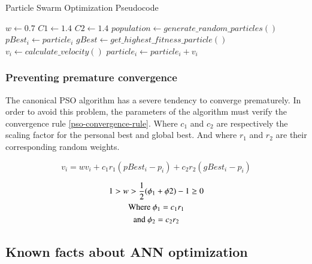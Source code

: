 \documentclass[a4paper,12pt, oneside]{memoir}
\begin{document}
\setlength{\columnsep}{20pt}
\begin{minipage}[H]{0.9\textwidth}
  \begin{algorithm}[H]\small
  \caption{Particle Swarm Optimization Pseudocode}\label{pseudocode-PSO}
    \begin{algorithmic}[1]
      \State $w  \gets 0.7$
      \State $C1 \gets 1.4$
      \State $C2 \gets 1.4$
      \State $population \gets generate\_random\_particles()$
      \Repeat
            \State $ pBest_i \gets particle_i$ 
          \EndIf
        \EndFor
        \State $gBest \gets get\_highest\_fitness\_particle()$
          \State $v_i         \gets calculate\_velocity()$ 
          \State $particle_i  \gets particle_i + v_i$
        \EndFor
    \end{algorithmic}
  \end{algorithm}
\end{minipage}
\hfill



\subsubsection{Preventing premature convergence}
The canonical PSO algorithm has a severe tendency to converge prematurely. In order to avoid this problem, the parameters of the algorithm must verify the convergence rule \ref{pso-convergence-rule}. Where $c_1$ and $c_2$ are respectively the scaling factor for the personal best and global best. And where $r_1$ and $r_2$ are their corresponding random weights.

\begin{equation} \label{velocity-formula}
    v_i = w v_i + c_1 r_1 (pBest_i - p_i) + c_2 r_2 (gBest_i - p_i)    
\end{equation}

\begin{gather} \label{pso-convergence-rule}
  1 > w > {1 \over 2} (\phi_1 + \phi2) - 1 \ge 0 \\
    \text{Where } \phi_1 = c_1 r_1 \\
    \text{and } \phi_2 = c_2 r_2 
\end{gather}

\clearpage

\subsection{Known facts about ANN optimization}
\end{document}

